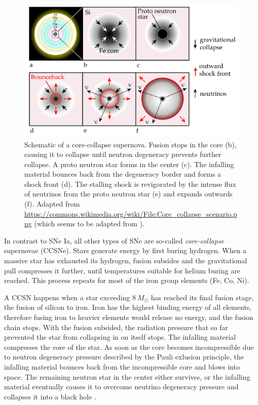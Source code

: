 \documentclass[
    a4paper, %
    fontsize=10pt, %
    twoside=false, %
    numbers=noenddot, %
    fontmethod=tex,
]{kaobook}
\begin{document}
\begin{figure}[htb]
    \includegraphics{theory/ccsn.pdf}
    \caption[Core-collapse supernova]{Schematic of a core-collapse supernova. Fusion stops in the core (b), causing it to collapse until neutron degeneracy prevents further collapse. A proto neutron star forms in the center (c). The infalling material bounces back from the degeneracy border and forms a shock front (d). The stalling shock is revigorated by the intense flux of neutrinos from the proto neutron star (e) and expands outwards (f). Adapted from \url{https://commons.wikimedia.org/wiki/File:Core_collapse_scenario.png} (which seems to be adapted from \cite{Janka2012}).}
\end{figure}

In contrast to SNe Ia, all other types of SNe are so-called \textit{core-collapse} supernovae (CCSNe).
Stars generate energy by first buring hydrogen. When a massive star has exhausted its hydrogen, fusion subsides and the gravitational pull compresses it further, until temperatures suitable for helium buring are reached. This process repeats for most of the iron group elements (Fe, Co, Ni).

A CCSN happens when a star exceeding $8~M_\odot$ has reached its final fusion stage, the fusion of silicon to iron. Iron has the highest binding energy of all elements, therefore fusing iron to heavier elements would release no energy, and the fusion chain stops. With the fusion subsided, the radiation pressure that so far prevented the star from collapsing in on itself stops. The infalling material compresses the core of the star. As soon as the core becomes incompressible due to neutron degeneracy pressure described by the Pauli exlusion principle, the infalling material bounces back from the incompressible core and blows into space. The remaining neutron star in the center either survives, or the infalling material eventually causes it to overcome neutrino degeneracy pressure and collapses it into a black hole \cite{Alsabti2017}.
\end{document}
